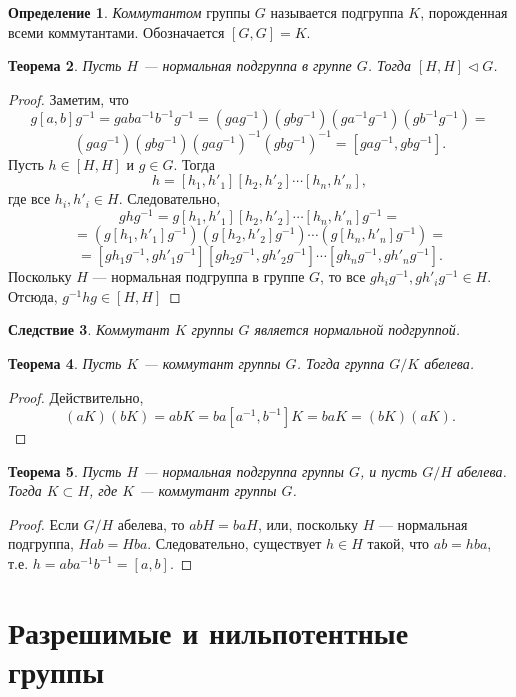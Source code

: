 \documentclass[12pt, titlepage, oneside]{amsbook}
\newtheorem{theorem}{Теорема}[chapter]
\newtheorem{corollary}[theorem]{Следствие}
\theoremstyle{definition}
\newtheorem{definition}[theorem]{Определение}
\theoremstyle{remark}
\begin{document}
\begin{definition}
\emph{Коммутантом} группы $G$ называется подгруппа $K$, порожденная всеми коммутантами. Обозначается $[G,G]=K$.
\end{definition}

\begin{theorem}
\label{Kom1}
Пусть $H$ --- нормальная подгруппа в группе $G$. Тогда $[H,H]\triangleleft G$.
\end{theorem}

\begin{proof}
Заметим, что $$g[a,b]g^{-1}=gaba^{-1}b^{-1}g^{-1}=(gag^{-1})(gbg^{-1})(ga^{-1}g^{-1})(gb^{-1}g^{-1})=$$ $$(gag^{-1})(gbg^{-1})(gag^{-1})^{-1}(gbg^{-1})^{-1}=[gag^{-1},gbg^{-1}].$$
Пусть $h\in [H,H]$ и $g\in G$. Тогда $$h=[h_1,h'_1][h_2,h'_2]\cdots[h_n,h'_n],$$ где все $h_i,h'_i\in H$. Следовательно, $$ghg^{-1}=g[h_1,h'_1][h_2,h'_2]\cdots[h_n,h'_n]g^{-1}=$$ $$=(g[h_1,h'_1]g^{-1})(g[h_2,h'_2]g^{-1})\cdots(g[h_n,h'_n]g^{-1})=$$ $$=[gh_1g^{-1},gh'_1g^{-1}][gh_2g^{-1},gh'_2g^{-1}]\cdots[gh_ng^{-1},gh'_ng^{-1}].$$ Поскольку $H$ --- нормальная подгруппа в группе $G$, то все $gh_ig^{-1},gh'_ig^{-1}\in H$. Отсюда, $g^{-1}hg\in [H,H]$
\end{proof}

\begin{corollary}
\label{Kom1a}
Коммутант $K$ группы $G$ является нормальной подгруппой.
\end{corollary}

\begin{theorem}
\label{Kom2}
Пусть $K$ --- коммутант группы $G$. Тогда группа $G/K$ абелева.
\end{theorem}

\begin{proof}
Действительно, $$(aK)(bK)=abK=ba[a^{-1},b^{-1}]K=baK=(bK)(aK).$$
\end{proof}

\begin{theorem}
\label{Kom3}
Пусть $H$ --- нормальная подгруппа группы $G$, и пусть $G/H$ абелева. Тогда $K\subset H$, где $K$ --- коммутант группы $G$.
\end{theorem}

\begin{proof}
Если $G/H$ абелева, то $abH=baH$, или, поскольку $H$ --- нормальная подгруппа, $Hab=Hba$. Следовательно, существует $h\in H$ такой, что $ab=hba$, т.е. $h=aba^{-1}b^{-1}=[a,b]$.
\end{proof}

\section{Разрешимые и нильпотентные группы}
\end{document}
